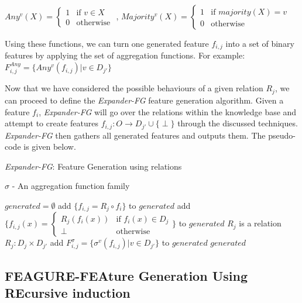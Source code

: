 \documentclass[twoside,11pt]{article}
\theoremstyle{definition}
\begin{document}
  $Any^v(X)=\begin{cases} 1 &\mbox{if } v\in X\\ 
 0 & \mbox{otherwise } \end{cases}$, 
 $Majority^v(X)=\begin{cases} 1 &\mbox{if } majority(X)=v
  \\ 
 0 & \mbox{otherwise } \end{cases}$
 
 Using these functions, we can turn one generated feature $f_{i,j}$ into a set of binary features by applying the set of aggregation functions. For example:  $F_{i,j}^{Any}=\{Any^v(f_{i,j})|v\in D_{j'}\}$

Now that we have considered the possible behaviours of a given relation $R_j$, we can proceed to define the \emph{Expander-FG} feature generation algorithm. Given a feature $f_i$, \emph{Expander-FG} will go over the relations within the knowledge base and attempt to create features $f_{i,j}:O\rightarrow D_{j'}\cup\{\perp\}$ through the discussed techniques. \emph{Expander-FG} then gathers all generated features and outputs them. The pseudo-code is given below.

\begin{algorithm}[H]
	\caption{\emph{Expander-FG}: Feature Generation using relations}
	\label{code-compete}
	\small
	$\sigma$ - An aggregation function family
	\begin{algorithmic}
		\State $generated=\emptyset$
					\State add $\{f_{i,j}=R_j\circ f_i\}$ to $generated$
					\State add $\{f_{i,j}(x)=\begin{cases} R_j( f_i(x)) &\mbox{if } f_i(x)\in D_j\\ 
						\perp & \mbox{otherwise } \end{cases}\}$ to $generated$
				\EndIf
			\Else \Comment $R_j$ is a relation $R_j:D_j\times D_{j'}$
				\State add $F^\sigma_{i,j}=\{\sigma^v(f_{i,j})|v\in D_{j'}\}$ to $generated$
			\EndIf
		\EndIf
		\EndFor
		\EndFor
		\State \Return $generated$ 
		\EndFunction
		
	\end{algorithmic}
\end{algorithm}

\subsection{FEAGURE-FEAture Generation Using REcursive induction}
\label{algorithm_section}
\end{document}
